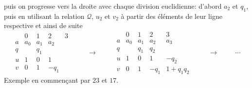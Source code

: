 puis on progresse vers la droite avec chaque division euclidienne: d'abord $a_2$ et $q_1$, puis en utilisant la relation $\mathcal Q$,  $u_2$ et $v_2$ à partir des éléments de leur ligne respective et ainsi de suite
\begin{displaymath}
\begin{array}{l|l|l|l|l}
 & 0 & 1 & 2 & 3 \\ \hline
a & a_0 & a_1 & a_2  &   \\
q &     & q_1 &      &   \\
u & 1   & 0   & 1    &   \\
v & 0   & 1   & -q_1 &
\end{array}
\hspace{1cm}\rightarrow\hspace{1cm}
\begin{array}{l|l|l|l|l}
 & 0 & 1 & 2 & 3 \\ \hline
a & a_0 & a_1 & a_2  & a_3 \\
q &     & q_1 & q_2  &   \\
u & 1   & 0   & 1    & -q_2 \\
v & 0   & 1   & -q_1 & 1+q_1q_2
\end{array}
\hspace{1cm}\rightarrow \hspace{1cm}\cdots
\end{displaymath}
Exemple en commençant par $23$ et $17$.
